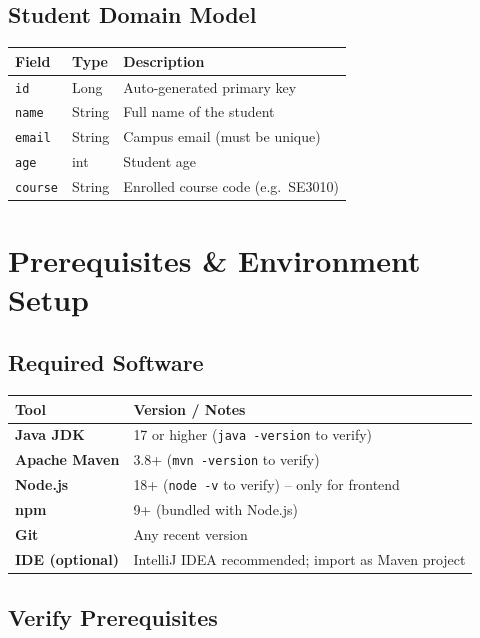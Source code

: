 \documentclass[12pt,a4paper]{article}
\begin{document}
\subsection{Student Domain Model}

\begin{tabularx}{\textwidth}{llX}
\toprule
\textbf{Field} & \textbf{Type} & \textbf{Description} \\
\midrule
\texttt{id}     & Long   & Auto-generated primary key \\
\texttt{name}   & String & Full name of the student \\
\texttt{email}  & String & Campus email (must be unique) \\
\texttt{age}    & int    & Student age \\
\texttt{course} & String & Enrolled course code (e.g.\ SE3010) \\
\bottomrule
\end{tabularx}

\section{Prerequisites \& Environment Setup}

\subsection{Required Software}

\begin{tabularx}{\textwidth}{>{\bfseries}lX}
\toprule
Tool & Version / Notes \\
\midrule
Java JDK & 17 or higher (\texttt{java -version} to verify) \\
Apache Maven & 3.8+ (\texttt{mvn -version} to verify) \\
Node.js & 18+ (\texttt{node -v} to verify) -- only for frontend \\
npm & 9+ (bundled with Node.js) \\
Git & Any recent version \\
IDE (optional) & IntelliJ IDEA recommended; import as Maven project \\
\bottomrule
\end{tabularx}

\subsection{Verify Prerequisites}
\end{document}
